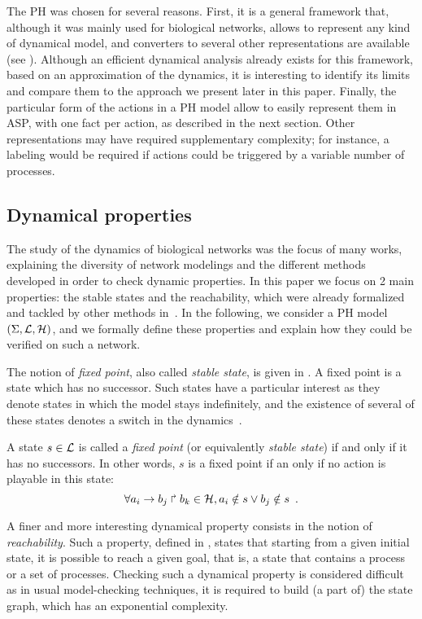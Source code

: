 The PH was chosen for several reasons.
First, it is a general framework that,
although it was mainly used for biological networks,
allows to represent any kind of dynamical model,
and converters to several other representations are available (see ).
Although an efficient dynamical analysis already exists for this framework,
based on an approximation of the dynamics,
it is interesting to identify its limits
and compare them to the approach we present later in this paper.
Finally, the particular form of the actions in a PH model allow
to easily represent them in ASP,
with one fact per action, as described in the next section.
Other representations may have required supplementary complexity;
for instance, a labeling would be required
if actions could be triggered by a variable number of processes.

\subsection{Dynamical properties}

The study of the dynamics of biological networks was the focus of many works, explaining the diversity of network modelings and the different methods developed in order to check dynamic properties.
In this paper we focus on 2 main properties: the stable states and the reachability,
which were already formalized and tackled by other methods in~\cite{PMR10-TCSB,PMR12-MSCS}.
In the following, we consider a PH model $(\Sigma,\mathcal{L},\mathcal{H})$,
and we formally define these properties
and explain how they could be verified on such a network.

The notion of \emph{fixed point}, also called \emph{stable state},
is given in .
A fixed point is a state which has no successor.
Such states have a particular interest as they denote states in which the model
stays indefinitely,
and the existence of several of these states denotes a switch in the dynamics~\cite{wuensche1998genomic}.

\begin{definition}
\label{def:fixpoint}
  A state $s \in \mathcal{L}$ is called a \emph{fixed point}
  (or equivalently \emph{stable state})
  if and only if it has no successors.
  In other words, $s$ is a fixed point if an only if no action is playable in this state:
  \[\forall a_i\rightarrow b_j\Rsh b_k \in \mathcal{H}, a_i \notin s \vee b_j \notin s \enspace.\]
\end{definition}

A finer and more interesting dynamical property consists in
the notion of \emph{reachability}.
Such a property, defined in ,
states that starting from a given initial state, it is possible
to reach a given goal, that is, a state that contains a process
or a set of processes.
Checking such a dynamical property is considered difficult
as in usual model-checking techniques,
it is required to build (a part of) the state graph,
which has an exponential complexity.

